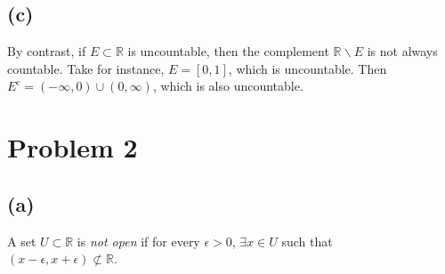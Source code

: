 \documentclass{article}
\newcommand{\R}{\mathbb{R}} %
\begin{document}
\subsection*{(c)}
By contrast, if $E \subset \R$ is uncountable, then the complement $\R \backslash E$ is not always countable. Take for instance, $E = [0 , 1]$, which is uncountable. Then \\$E^c = (-\infty, 0) \cup (0, \infty)$, which is also uncountable.
\section*{Problem 2}
\subsection*{(a)}
A set $U \subset \R$ is \textit{not open} if for every $\epsilon > 0$, $\exists x \in U$ such that \\$(x-\epsilon, x+\epsilon) \not\subset \R$.
\end{document}
